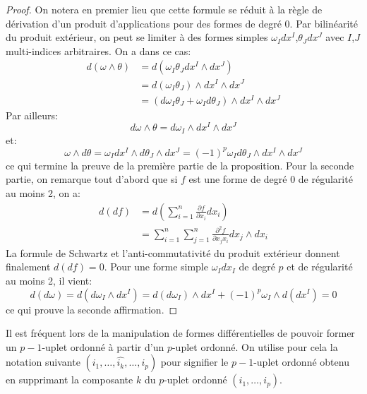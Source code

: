 \begin{proof}
On notera en premier lieu que cette formule se réduit à la règle de dérivation d'un produit d'applications pour des formes de degré $0$. Par bilinéarité du produit extérieur, on peut se limiter à des formes simples $\omega_I dx^I$,$\theta_J dx^J$ avec $I$,$J$ multi-indices arbitraires. 
On a dans ce cas:
\begin{align*}
d\left(\omega\wedge \theta\right) & = d\left(\omega_I\theta_J dx^I \wedge dx^J\right) \\ & =  d\left(\omega_I\theta_J \right)\wedge dx^I \wedge dx^J \\
& = (d\omega_I \theta_J + \omega_I d \theta_J) \wedge dx^I \wedge dx^J
\end{align*}
Par ailleurs:
\[
d\omega \wedge \theta = d\omega_I \wedge dx^I \wedge dx^J
\]
et:
\[
\omega \wedge d\theta = \omega_I dx^I \wedge d\theta_J \wedge dx^J = (-1)^p \omega_I d\theta_J \wedge dx^I \wedge dx^J
\]
ce qui termine la preuve de la première partie de la proposition. 
Pour la seconde partie, on remarque tout d'abord que si $f$ est une forme de degré $0$ de régularité au moins 2, on a:
\begin{align*}
d(df) &= d \left(\sum_{i=1}^n \frac{\partial f}{\partial x_i} dx_i\right) \\
&=  \sum_{i=1}^n \sum_{j=1}^n \frac{\partial^2 f}{\partial x_j x_i} dx_j \wedge dx_i 
\end{align*}
La formule de Schwartz et l'anti-commutativité du produit extérieur donnent finalement $d(df) = 0$. Pour une forme simple $\omega_I dx_I$ de degré $p$ et de régularité au moins 2, il vient:
\[
d(d\omega) = d\left(d\omega_I \wedge dx^I\right) = d(d\omega_I)\wedge dx^I + (-1)^p \omega_I \wedge d(dx^I) = 0
\]
ce qui prouve la seconde affirmation. 
\end{proof}
\begin{notation}
Il est fréquent lors de la manipulation de formes différentielles de pouvoir former un $p-1$-uplet ordonné à partir d'un $p$-uplet ordonné. On utilise pour cela la notation suivante $(i_1,\dots,\widehat{i_k},\dots,i_p)$ pour signifier le $p-1$-uplet ordonné obtenu en supprimant la composante $k$ du $p$-uplet ordonné $(i_1,\dots,i_p)$. 
\end{notation}


